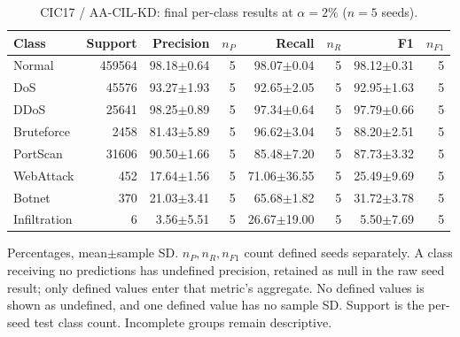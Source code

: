 \begin{table}[t]
\centering\scriptsize
\setlength{\tabcolsep}{3.3pt}
\caption{CIC17 / AA-CIL-KD: final per-class results at $\alpha=2\%$ ($n=5$ seeds).}\label{tab:forgetting-class-cic_ids_2017-aacil-kd}
\begin{tabular}{lrrrrrrr}
\toprule
Class & Support & Precision & $n_P$ & Recall & $n_R$ & F1 & $n_{F1}$ \\
\midrule
Normal & 459564 & 98.18$\pm$0.64 & 5 & 98.07$\pm$0.04 & 5 & 98.12$\pm$0.31 & 5 \\
DoS & 45576 & 93.27$\pm$1.93 & 5 & 92.65$\pm$2.05 & 5 & 92.95$\pm$1.63 & 5 \\
DDoS & 25641 & 98.25$\pm$0.89 & 5 & 97.34$\pm$0.64 & 5 & 97.79$\pm$0.66 & 5 \\
Bruteforce & 2458 & 81.43$\pm$5.89 & 5 & 96.62$\pm$3.04 & 5 & 88.20$\pm$2.51 & 5 \\
PortScan & 31606 & 90.50$\pm$1.66 & 5 & 85.48$\pm$7.20 & 5 & 87.73$\pm$3.32 & 5 \\
WebAttack & 452 & 17.64$\pm$1.56 & 5 & 71.06$\pm$36.55 & 5 & 25.49$\pm$9.69 & 5 \\
Botnet & 370 & 21.03$\pm$3.41 & 5 & 65.68$\pm$1.82 & 5 & 31.72$\pm$3.78 & 5 \\
Infiltration & 6 & 3.56$\pm$5.51 & 5 & 26.67$\pm$19.00 & 5 & 5.50$\pm$7.69 & 5 \\
\bottomrule
\end{tabular}
\par\smallskip\begin{minipage}{0.98\textwidth}\scriptsize Percentages, mean$\pm$sample SD. $n_P,n_R,n_{F1}$ count defined seeds separately. A class receiving no predictions has undefined precision, retained as null in the raw seed result; only defined values enter that metric's aggregate. No defined values is shown as undefined, and one defined value has no sample SD. Support is the per-seed test class count. Incomplete groups remain descriptive.\end{minipage}
\end{table}


